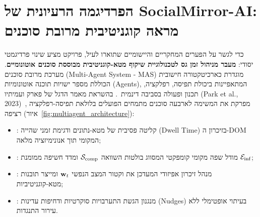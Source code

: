 \section{הפרדיגמה הרעיונית של SocialMirror-AI: מראה קוגניטיבית מרובת סוכנים}
\label{sec:gaps_conceptual_paradigm}
כדי לגשר על הפערים המחקריים והיישומיים שתוארו לעיל, פרויקט \projectname{} מציע שינוי פרדיגמטי יסודי: \textbf{מעבר מניהול זמן גס לטכנולוגיית שיקוף מטא-קוגניטיבית מבוססת סוכנים אוטונומיים}. מערכת מרובת סוכנים (\textenglish{Multi-Agent System - MAS}) מוגדרת כארכיטקטורה חישובית הכוללת מספר ישויות תוכנה אוטונומיות (\textenglish{Agents}), המתאפיינות ביכולת תפיסה, רפלקציה, תכנון ופעולה בסביבה דינמית~\cite{wooldridge2009introduction, wang2024survey}. בהשראת מאמר הדגל של פארק ועמיתיו (\textenglish{Park et al., 2023})~\cite{park2023generative}, \projectname{} מפרקת את המשימה לארבעה סוכנים מתמחים הפועלים בלולאת תפיסה-רפלקציה רציפה (איור~\ref{fig:multiagent_architecture}):
\begin{itemize}
    \item \textbf{\agentObserver{}}: קליטה פסיבית של מטא-נתונים ודגימת זמני שהייה (\textenglish{Dwell Time}) בזיכרון ה-DOM המקומי תוך אנונימיזציה מלאה;
    \item \textbf{\agentAnalyst{}}: מודל שפה מקומי קומפקטי המסווג בולטות השוואה $\mathcal{S}_{\text{comp}}{}$ ומדד חשיפה ממומנת $\mathcal{E}_{\text{inf}}{}$;
    \item \textbf{\agentReflector{}}: מנהל זיכרון אפיזודי המעדכן את וקטור המצב הנפשי $\mathbf{w}_t{}$ ומייצר תובנות מטא-קוגניטיביות;
    \item \textbf{\agentInterventionist{}}: מנגנון הגשת התערבויות סוקרטיות ודחיפות עדינות (\textenglish{Nudges}) בעיתוי אופטימלי ללא עירור התנגדות.
\end{itemize}

